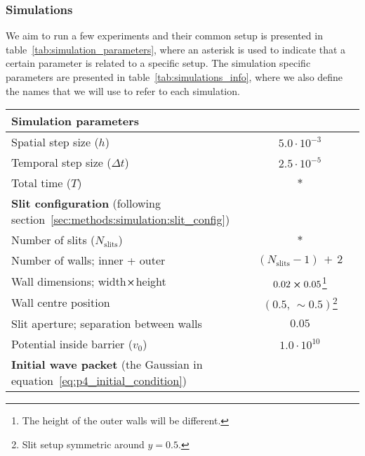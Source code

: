     \subsubsection{Simulations}\label{sec:methods:simulation:simulations}

        We aim to run a few experiments and their common setup is presented in table~\ref{tab:simulation_parameters}, where an asterisk is used to indicate that a certain parameter is related to a specific setup. The simulation specific parameters are presented in table~\ref{tab:simulations_info}, where we also define the names that we will use to refer to each simulation. 

        \begin{table}[ht!]
            \centering
            \begin{tabular}{l|c}
                \hline
                \multicolumn{2}{l}{\textbf{Simulation parameters}} \\
                \hline
                Spatial step size ($h$)         & $5.0 \cdot 10^{-3}$   \\
                Temporal step size ($\Delta t$) & $2.5 \cdot 10^{-5}$   \\
                Total time ($T$)                & $*$                   \\
                \hline
                \multicolumn{2}{l}{\textbf{Slit configuration} (following section~\ref{sec:methods:simulation:slit_config})} \\
                \hline
                Number of slits ($N_\mathrm{slits}$)    & $*$                           \\
                Number of walls; inner + outer          & $(N_\mathrm{slits}-1) \, + \, 2$\\
                Wall dimensions; width$\cross$height    & $0.02\cross 0.05$\footnote{The height of the outer walls will be different.} \\
                Wall centre position                    & $(0.5,\, \sim\!0.5)$\footnote{Slit setup symmetric around $y=0.5$.}   \\
                Slit aperture; separation between walls & $0.05$                        \\
                Potential inside barrier ($v_0$)        & $1.0\cdot 10^{10}$            \\
                \hline
                \multicolumn{2}{l}{\textbf{Initial wave packet} (the Gaussian in equation~\eqref{eq:p4_initial_condition})} \\

\end{tabular}
\end{table}
